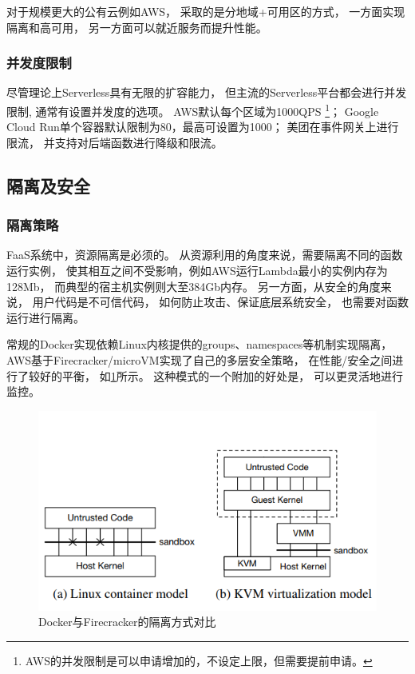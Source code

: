 对于规模更大的公有云例如AWS，
采取的是分地域+可用区的方式，
一方面实现隔离和高可用，
另一方面可以就近服务而提升性能\cite{aws_global_infra}。

\subsubsection{并发度限制}
尽管理论上Serverless具有无限的扩容能力，
但主流的Serverless平台都会进行并发限制,
通常有设置并发度的选项。
AWS默认每个区域为1000QPS
\footnote{AWS的并发限制是可以申请增加的，不设定上限，但需要提前申请。}\cite{lambda_concurrency}；
Google Cloud Run单个容器默认限制为80，最高可设置为1000\cite{google_cloud_run_concurrency}；
美团在事件网关上进行限流，
并支持对后端函数进行降级和限流\cite{meituan_serverless_nest}。

\subsection{隔离及安全}
\subsubsection{隔离策略}
FaaS系统中，资源隔离是必须的。
从资源利用的角度来说，需要隔离不同的函数运行实例，
使其相互之间不受影响，例如AWS运行Lambda最小的实例内存为128Mb，
而典型的宿主机实例则大至384Gb内存。
另一方面，从安全的角度来说，
用户代码是不可信代码，
如何防止攻击、保证底层系统安全，
也需要对函数运行进行隔离。

常规的Docker实现依赖Linux内核提供的groups、namespaces等机制实现隔离，
AWS基于Firecracker/microVM实现了自己的多层安全策略，
在性能/安全之间进行了较好的平衡，
如\cref{firecracker_isolation_model}所示\cite{Agache2020, aws_2020_function_isolation}。
这种模式的一个附加的好处是，
可以更灵活地进行监控。

\begin{figure}[ht!]
    \centering
    \includegraphics[width=0.7\linewidth]{images/firecrack-isolation.png}
    \caption{Docker与Firecracker的隔离方式对比\cite{Agache2020}}
    \label{firecracker_isolation_model}
\end{figure}

